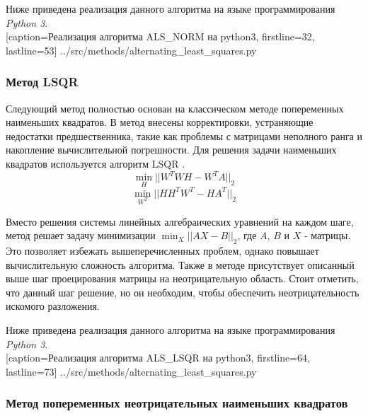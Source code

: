 \newpage

Ниже приведена реализация данного алгоритма на языке программирования \textit{Python 3}.
\\


  [caption=Реализация алгоритма ALS\_NORM на python3, firstline=32, lastline=53]
  {../src/methods/alternating_least_squares.py}

\newpage

\subsubsection{Метод LSQR}

Следующий метод полностью основан на классическом методе попеременных наименьших квадратов.
В метод внесены корректировки, устраняющие недостатки предшественника, такие как проблемы
с матрицами неполного ранга и накопление вычислительной погрешности.
Для решения задачи наименьших квадратов используется алгоритм LSQR \cite{lsqr}.
\begin{equation}
  \min_H||W^TWH - W^TA||_2
\end{equation}
\begin{equation}
  \min_{W^T}||HH^TW^T - HA^T||_2
\end{equation}

Вместо решения системы линейных алгебраических уравнений на каждом шаге,
метод решает задачу минимизации $\displaystyle\min_X||AX - B||_2$, где $A$, $B$ и $X$ - матрицы.
Это позволяет избежать вышеперечисленных проблем,
однако повышает вычислительную сложность алгоритма.
Также в методе присутствует описанный выше шаг проецирования матрицы
на неотрицательную область.
Стоит отметить, что данный шаг  решение, но он необходим,
чтобы обеспечить неотрицательность искомого разложения.

\newpage

Ниже приведена реализация данного алгоритма на языке программирования \textit{Python 3}.
\\


  [caption=Реализация алгоритма ALS\_LSQR на python3, firstline=64, lastline=73]
  {../src/methods/alternating_least_squares.py}



\newpage


\subsubsection{Метод попеременных неотрицательных наименьших квадратов}

